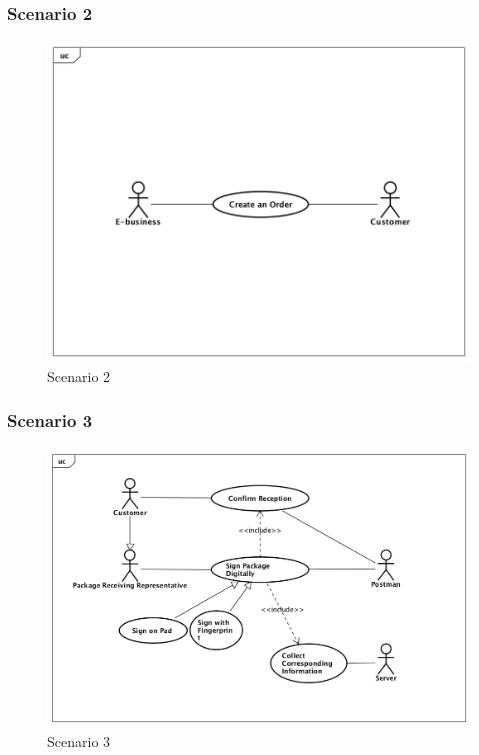 \documentclass[12pt]{scrreprt}
\begin{document}
\subsubsection{Scenario 2}
\begin{figure}[htbp]
  \centering\includegraphics[width=6in]{DocumentRes/Scenario2.png}
  \caption{Scenario 2}
\end{figure}

\subsubsection{Scenario 3}
\begin{figure}[htbp]
  \centering\includegraphics[width=6in]{DocumentRes/Scenario3.png}
  \caption{Scenario 3}
\end{figure}
\end{document}
